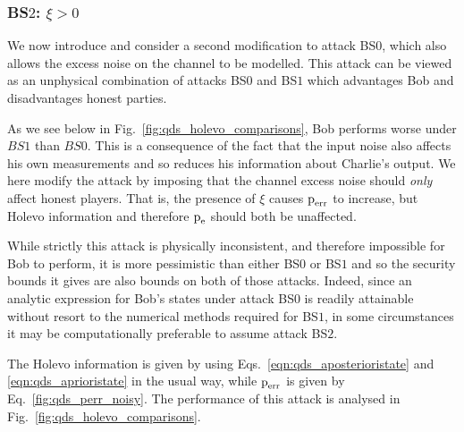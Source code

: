 \subsubsection{BS$2$: $\xi > 0$}\label{sec:qds_bs2}
We now introduce and consider a second modification to attack BS$0$, which also allows the excess noise on the channel to be modelled. This attack can be viewed as an unphysical combination of attacks BS$0$ and BS$1$ which advantages Bob and disadvantages honest parties.

As we see below in Fig.~\ref{fig:qds_holevo_comparisons}, Bob performs worse under $BS1$ than $BS0$. This is a consequence of the fact that the input noise also affects his own measurements and so reduces his information about Charlie's output. We here modify the attack by imposing that the channel excess noise should \emph{only} affect honest players. That is, the presence of $\xi$ causes $\text{p}_{\text{err}}$ to increase, but Holevo information and therefore $\text{p}_{\text{e}}$ should both be unaffected. 

While strictly this attack is physically inconsistent, and therefore impossible for Bob to perform, it is more pessimistic than either BS$0$ or BS$1$ and so the security bounds it gives are also bounds on both of those attacks. Indeed, since an analytic expression for Bob's states under attack BS$0$ is readily attainable without resort to the numerical methods required for BS$1$, %
in some circumstances it may be computationally preferable to assume attack BS$2$.

The Holevo information is given by using Eqs.~\ref{eqn:qds_aposterioristate} and \ref{eqn:qds_aprioristate} in the usual way, while $\text{p}_{\text{err}}$ is given by Eq.~\ref{fig:qds_perr_noisy}. The performance of this attack is analysed in Fig.~\ref{fig:qds_holevo_comparisons}.

